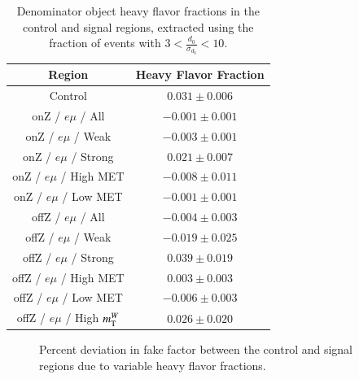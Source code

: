   \begin{table}
    \centering
    \begin{tabular}{cc}
      Region & Heavy Flavor Fraction \\
      \hline
      Control        &  $ 0.031 \pm  0.006$ \\
      onZ / $e\mu$ / All      &  $-0.001 \pm  0.001$ \\
      onZ / $e\mu$ / Weak     &  $-0.003 \pm  0.001$ \\
      onZ / $e\mu$ / Strong   &  $ 0.021 \pm  0.007$ \\
      onZ / $e\mu$ / High MET  &  $-0.008 \pm  0.011$ \\
      onZ / $e\mu$ / Low MET   &  $-0.001 \pm  0.001$ \\
      offZ / $e\mu$ / All     &  $-0.004 \pm  0.003$ \\
      offZ / $e\mu$ / Weak    &  $-0.019 \pm  0.025$ \\
      offZ / $e\mu$ / Strong  &  $ 0.039 \pm  0.019$ \\
      offZ / $e\mu$ / High MET &  $ 0.003 \pm  0.003$ \\
      offZ / $e\mu$ / Low MET  &  $-0.006 \pm  0.003$ \\
      offZ / $e\mu$ / High $m_{\mathrm{T}}^W$ &  $ 0.026 \pm  0.020$ \\
    \end{tabular}
    \caption{Denominator object heavy flavor fractions in the control and signal regions, extracted using the fraction of events with $3<\frac{d_0}{\sigma_{d_0}}<10$.}
    \label{t:el-ff-heavy-flavor-fractions}
  \end{table}


  \begin{figure}
    \centering
    \caption{Percent deviation in fake factor between the control and signal regions due to variable heavy flavor fractions.}
    \label{fig:el-ff-syst-hflf}
  \end{figure}





